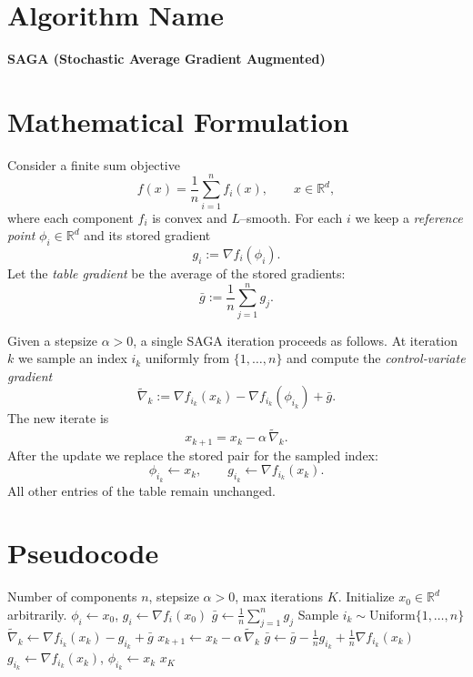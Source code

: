\documentclass{article}
\newcommand{\R}{\mathbb{R}}
\begin{document}
\section*{Algorithm Name}
\textbf{SAGA (Stochastic Average Gradient Augmented)}  

\section*{Mathematical Formulation}
Consider a finite sum objective  
\[
f(x)=\frac{1}{n}\sum_{i=1}^{n}f_i(x),\qquad x\in\R^{d},
\]
where each component $f_i$ is convex and $L$–smooth.  
For each $i$ we keep a {\em reference point} $\phi_i\in\R^{d}$ and its stored gradient
\[
g_i:=\nabla f_i(\phi_i).
\]
Let the {\em table gradient} be the average of the stored gradients:
\[
\bar g:=\frac{1}{n}\sum_{j=1}^{n}g_j .
\]

Given a stepsize $\alpha>0$, a single SAGA iteration proceeds as follows.  
At iteration $k$ we sample an index $i_k$ uniformly from $\{1,\dots,n\}$ and compute the
\emph{control‑variate gradient}
\[
\widetilde{\nabla}_k:=\nabla f_{i_k}(x_k)-\nabla f_{i_k}(\phi_{i_k})+\bar g .
\tag{1}
\]
The new iterate is
\[
x_{k+1}=x_k-\alpha\,\widetilde{\nabla}_k .
\tag{2}
\]
After the update we replace the stored pair for the sampled index:
\[
\phi_{i_k}\gets x_k,\qquad 
g_{i_k}\gets \nabla f_{i_k}(x_k).
\tag{3}
\]
All other entries of the table remain unchanged.  

\section*{Pseudocode}
\begin{algorithm}[H]
\caption{SAGA}
\begin{algorithmic}[1]
\REQUIRE Number of components $n$, stepsize $\alpha>0$, max iterations $K$.
\STATE Initialize $x_0\in\R^{d}$ arbitrarily.
    \STATE $\phi_i\gets x_0$, \; $g_i\gets \nabla f_i(x_0)$
\ENDFOR
\STATE $\bar g\gets \frac1n\sum_{j=1}^n g_j$
    \STATE Sample $i_k\sim\text{Uniform}\{1,\dots,n\}$
    \STATE $\widetilde{\nabla}_k\gets \nabla f_{i_k}(x_k)-g_{i_k}+\bar g$
    \STATE $x_{k+1}\gets x_k-\alpha\,\widetilde{\nabla}_k$
    \STATE $\bar g\gets \bar g -\frac{1}{n}g_{i_k}+ \frac{1}{n}\nabla f_{i_k}(x_k)$
    \STATE $g_{i_k}\gets \nabla f_{i_k}(x_k)$,\; $ \phi_{i_k}\gets x_k$
\ENDFOR
\RETURN $x_K$
\end{algorithmic}
\end{algorithm}
\end{document}
